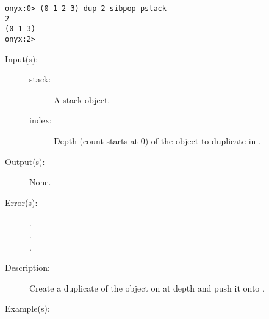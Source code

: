 \begin{description}
\begin{description}
\begin{verbatim}
onyx:0> (0 1 2 3) dup 2 sibpop pstack
2
(0 1 3)
onyx:2>
		\end{verbatim}
	\end{description}
\label{systemdict:sidup}
\item[{\onyxop{stack index}{sidup}{--}}: ]
	\begin{description}\item[]
	\item[Input(s): ]
		\begin{description}\item[]
		\item[stack: ]
			A stack object.
		\item[index: ]
			Depth (count starts at 0) of the object to duplicate in
			.
		\end{description}
	\item[Output(s): ] None.
	\item[Error(s): ]
		\begin{description}\item[]
		\item[.]
		\item[.]
		\item[.]
		\end{description}
	\item[Description: ]
		Create a duplicate of the object on  at depth
		 and push it onto .
	\item[Example(s): ]\begin{verbatim}


\end{verbatim}
\end{description}
\end{description}
